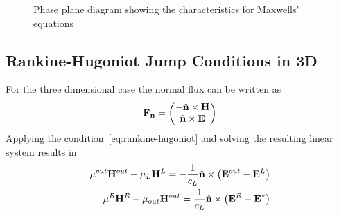 \begin{figure}[h]
  \centering
  
  \caption{Phase plane diagram showing the characteristics for Maxwells' equations}
  \label{fig:phase-plane-characteristics}
\end{figure}

\subsection{Rankine-Hugoniot Jump Conditions in 3D}
For the three dimensional case the normal flux can be written as
\begin{align*}
\mathbf{\mathbf{F}_n} =
\begin{pmatrix}
- \hat{\mathbf{n}} \times \mathbf{H} \\
\hat{\mathbf{n}} \times \mathbf{E}
\end{pmatrix}
\end{align*}
Applying the condition~\eqref{eq:rankine-hugoniot} and solving the resulting linear system results in
\begin{align}
  \mu^{out} \mathbf{H}^{out} - \mu_L \mathbf{H}^{L} = - \frac{1}{c_{L}} \hat{\mathbf{n}} \times \left( \mathbf{E}^{out} - \mathbf{E}^{L} \right)
  \label{eq:jump-condition-resulting-equation-system-3D-1} \\
  \mu^{R} \mathbf{H}^{R} - \mu_{out} \mathbf{H}^{out} = \frac{1}{c_{L}} \hat{\mathbf{n}} \times \left( \mathbf{E}^{R} - \mathbf{E}^{*} \right)
  \label{eq:jump-condition-resulting-equation-system-3D-2} \\
\end{align}
